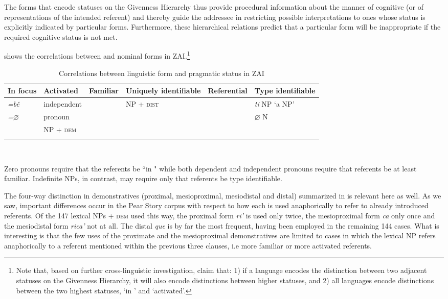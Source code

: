 \newpage 
The forms that encode statuses on the Givenness Hierarchy thus provide procedural information about the manner of cognitive  (or  of representations of the intended referent) and thereby guide the addressee in restricting possible interpretations to ones whose status is explicitly indicated by particular forms. Furthermore, these  hierarchical relations predict that a particular form will be inappropriate if the required cognitive status is not met. 


 shows the correlations between  and nominal forms in ZAI.\footnote{Note that, based on further cross-linguistic investigation, \citet{gundel2010} claim that: 1) if a language encodes the distinction between two adjacent statuses on the Givenness Hierarchy, it will also encode distinctions between higher statuses, and 2) all languages encode distinctions between the two highest statuses, `in ' and `activated'.}


\begin{table}

\begin{tabularx}{\textwidth}{lllQlQ}
\lsptoprule
 {In} {focus}& {Activated} & {Familiar} & {Uniquely} {identifiable} & {Referential} & {Type} {identifiable} \\ 

 
\midrule
 \textit{=b\v{e}}  & independent &  & NP + \textsc{dist} &  & \textit{ti} NP `a NP' \\
  \textit{=$\varnothing$}  &  pronoun &  & & & {$\varnothing$ N}   \\
  & NP + \textsc{dem} & & & &  \\

\lspbottomrule
\end{tabularx}\\
\caption{{Correlations between linguistic form and pragmatic status in ZAI}}
\label{izcorrelations}

\end{table}


Zero pronouns require that the referents be ``in " while both dependent and independent pronouns require that referents be at least familiar. Indefinite NPs, in contrast, may require only that referents be type identifiable. 

The four-way distinction in demonstratives (proximal, mesioproximal, mesio\-distal and distal) summarized in  is relevant here as well. As we saw, important differences occur in the Pear Story corpus with respect to how each  is used anaphorically to refer to already introduced referents. Of the 147 lexical NPs + \textsc{dem} used this way, the proximal form \textit{ri'} is used only twice, the mesioproximal form \textit{ca} only once and the mesiodistal form \textit{rica'} not at all. The distal  \textit{que} is by far the most frequent, having been employed in the remaining 144 cases. What is interesting is that the few uses of the proximate and the mesioproximal demonstratives are limited to cases in which the lexical NP refers anaphorically to a referent mentioned within the previous three clauses, i.e more familiar or more activated referents. 

